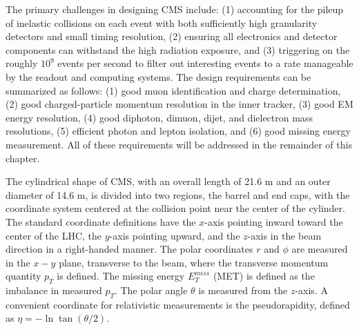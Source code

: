 \indent The primary challenges in designing CMS include: (1) accounting for the pileup of inelastic collisions on each event with both sufficiently high granularity detectors and small timing resolution, (2) ensuring all electronics and detector components can withstand the high radiation exposure, and (3) triggering on the roughly $10^9$ events per second to filter out interesting events to a rate manageable by the readout and computing systems. The design requirements can be summarized as follows: (1) good muon identification and charge determination, (2) good charged-particle momentum resolution in the inner tracker, (3) good EM energy resolution, (4) good diphoton, dimuon, dijet, and dielectron mass resolutions, (5) efficient photon and lepton isolation, and (6) good missing energy measurement. All of these requirements will be addressed in the remainder of this chapter.

\indent The cylindrical shape of CMS, with an overall length of 21.6 m and an outer diameter of 14.6 m, is divided into two regions, the barrel and end caps, with the coordinate system centered at the collision point near the center of the cylinder. The standard coordinate definitions have the $x$-axis pointing inward toward the center of the LHC, the $y$-axis pointing upward, and the $z$-axis in the beam direction in a right-handed manner. The polar coordinates $r$ and $\phi$ are measured in the $x-y$ plane, transverse to the beam, where the transverse momentum quantity $p_T$ is defined. The missing energy $E_T^{miss}$ (MET) is defined as the imbalance in measured $p_T$. The polar angle $\theta$ is measured from the $z$-axis. A convenient coordinate for relativistic measurements is the pseudorapidity, defined as $\eta = -\ln{\tan(\theta/2)}$. 

